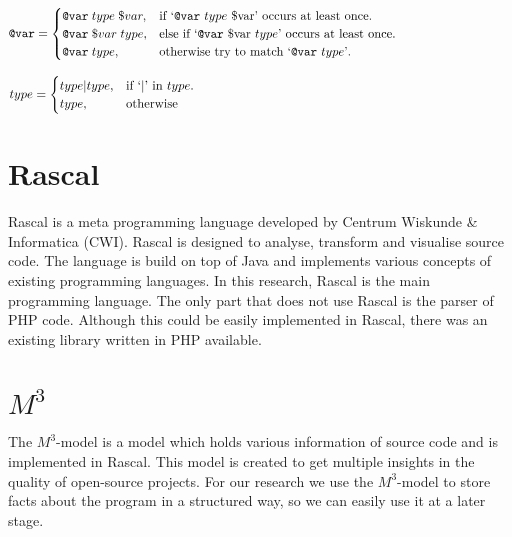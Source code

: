 \documentclass[../main.tex]{subfiles}
\begin{document}
\begin{equation}
  \begin{aligned}
  \texttt{@var}=\begin{cases}
    \texttt{@var} \; type \; \$var, & \text{if `\texttt{@var} $type$ \$var' occurs at least once}.\\
    \texttt{@var} \; \$var \; type, & \text{else if `\texttt{@var} \$var $type$' occurs at least once}.\\
    \texttt{@var} \; type, & \text{otherwise try to match `\texttt{@var} $type$'}.\\
  \end{cases}
  \end{aligned}
  \phantom{\hspace{3.2cm}} %
\end{equation}

\begin{equation}
  \begin{aligned}
  type=\begin{cases}
    type|type, & \text{if `$\vert$' in $type$}.\\
    type, & \text{otherwise}
  \end{cases}
  \end{aligned}
  \phantom{\hspace{8.8cm}} %
\end{equation}
 
    \section{Rascal}\label{sec:background_rascal}
    \Gls{Rascal}\cite{Kli:09} is a meta programming language developed by Centrum Wiskunde \& Informatica (CWI).
    Rascal is designed to analyse, transform and visualise source code.
    The language is build on top of Java and implements various concepts of existing programming languages.
    In this research, Rascal is the main programming language.
    The only part that does not use Rascal is the parser of PHP code.
    Although this could be easily implemented in Rascal, there was an existing library written in PHP available.

    \section{$M^3$}\label{sec:background_m3}
    The $M^3$-model\cite{Ana:13} is a model which holds various information of source code and is implemented in Rascal.
    This model is created to get multiple insights in the quality of open-source projects.
    For our research we use the $M^3$-model to store facts about the program in a structured way, so we can easily use it at a later stage.
    
\end{document}
